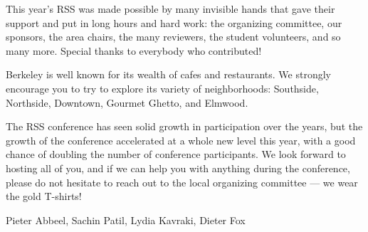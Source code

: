 \vspace{1mm}

This year’s RSS was made possible by many invisible hands that gave their support and put in long hours and hard work: the organizing committee, our sponsors, the area chairs, the many reviewers, the student volunteers, and so many more. Special thanks to everybody who contributed!

\vspace{1mm}

Berkeley is well known for its wealth of cafes and restaurants. We strongly encourage you to try to explore its variety of neighborhoods: Southside, Northside, Downtown, Gourmet Ghetto, and Elmwood.

\vspace{1mm}

The RSS conference has seen solid growth in participation over the years, but the growth of the conference accelerated at a whole new level this year, with a good chance of doubling the number of conference participants. We look forward to hosting all of you, and if we can help you with anything during the conference, please do not hesitate to reach out to the local organizing committee --- we wear the gold T-shirts! 

\vspace{1cm}

Pieter Abbeel, Sachin Patil, Lydia Kavraki, Dieter Fox
%
\endgroup{}
\normalsize


